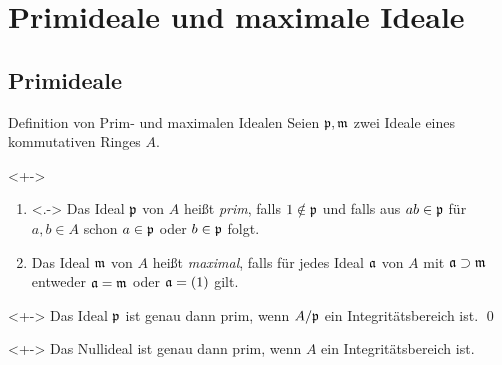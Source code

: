 \section{Primideale und maximale Ideale}

\subsection{Primideale}

\begin{frame}{Definition von Prim- und maximalen Idealen}
    Seien \(\mathfrak{p}, \mathfrak{m}\) zwei Ideale eines kommutativen Ringes \(A\).
    \begin{definition}<+->
        \begin{enumerate}[<+->]
        \item<.->
            Das Ideal \(\mathfrak{p}\) von \(A\) heißt \emph{prim},
            falls \(1 \notin \mathfrak{p}\) und falls
            aus \(a b \in \mathfrak{p}\) für \(a, b \in A\) schon \(a \in \mathfrak{p}\)
            oder \(b \in \mathfrak{p}\) folgt.
        \item
            Das Ideal \(\mathfrak{m}\) von \(A\) heißt \emph{maximal},
            falls für jedes Ideal \(\mathfrak{a}\) von \(A\)
            mit \(\mathfrak{a} \supset \mathfrak{m}\) \alert{entweder} \(\mathfrak{a} = \mathfrak{m}\)
            \alert{oder} \(\mathfrak{a} = (1)\) gilt.
        \end{enumerate}
    \end{definition}
    \begin{proposition}<+->
        Das Ideal \(\mathfrak{p}\) ist genau dann prim, wenn \(A/\mathfrak{p}\) ein 
        Integritätsbereich ist.
        \qed
    \end{proposition}
    \begin{example}<+->
        Das Nullideal ist genau dann prim, wenn \(A\) ein Integritätsbereich ist.
    \end{example}
\end{frame}

